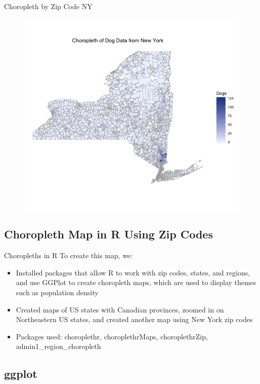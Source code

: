 \documentclass{beamer}
\begin{document}
\begin{frame}{Choropleth by Zip Code NY}
\centering
\begin{figure}
\includegraphics[width=.9\textwidth]{New_York_Choropleth.png}
\end{figure}

\end{frame}

\subsection{Choropleth Map in R Using Zip Codes}
\begin{frame}{Choropleths in R}
To create this map, we:
\begin{itemize}

\item Installed packages that allow R to work with zip codes, states, and regions, and use GGPlot to create choropleth maps, which are used to display themes such as population density
\item Created maps of US states with Canadian provinces, zoomed in on Northeastern US states, and created another map using New York zip codes
\item Packages used: choroplethr, choroplethrMaps, choroplethrZip, admin1\_region\_choropleth 
\end{itemize}

\end{frame}

\subsection{ggplot}
\end{document}
